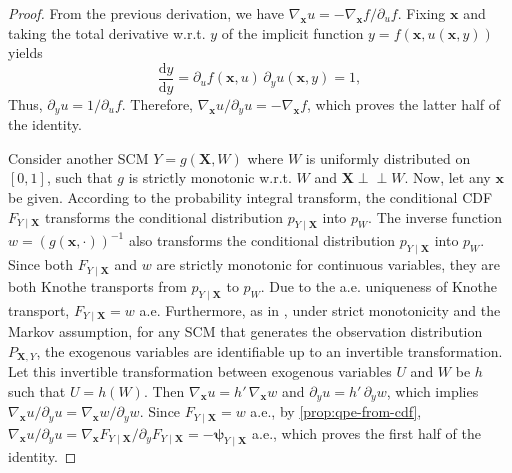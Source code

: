 \documentclass{article}
\theoremstyle{plain}
\theoremstyle{definition}
\theoremstyle{remark}
\newcommand{\indep}{\perp\!\!\!\perp}
\begin{document}
\qpecv*
\begin{proof}
From the previous derivation, we have $\nabla_{\bm{x}} u=-\nabla_{\bm{x}} f/\partial_u f$. Fixing $\bm{x}$ and taking the total derivative w.r.t. $y$ of the implicit function $y=f(\bm{x},u(\bm{x},y))$ yields
\[\frac{\text{d}y}{\text{d}y}=\partial_u f(\bm{x},u)\,\partial_y u(\bm{x},y)=1,\]
Thus, $\partial_yu=1/\partial_uf$. Therefore, $\nabla_{\bm{x}} u/\partial_yu=-\nabla_{\bm{x}}f$, which proves the latter half of the identity.

Consider another SCM $Y=g(\bm{X},W)$ where $W$ is uniformly distributed on $[0,1]$, such that $g$ is strictly monotonic w.r.t. $W$ and $\bm{X}\indep W$. Now, let any $\bm{x}$ be given. According to the probability integral transform, the conditional CDF $F_{Y\mid\bm{X}}$ transforms the conditional distribution $p_{Y\mid\bm{X}}$ into $p_W$. The inverse function $w=(g(\bm{x},\cdot))^{-1}$ also transforms the conditional distribution $p_{Y\mid\bm{X}}$ into $p_W$. Since both $F_{Y\mid\bm{X}}$ and $w$ are strictly monotonic for continuous variables, they are both Knothe transports from $p_{Y\mid\bm{X}}$ to $p_W$. Due to the a.e. uniqueness of Knothe transport, $F_{Y\mid\bm{X}}=w$ a.e. Furthermore, as in \citep{Nasr-Esfahany2023}, under strict monotonicity and the Markov assumption, for any SCM that generates the observation distribution $P_{\bm{X},Y}$, the exogenous variables are identifiable up to an invertible transformation. Let this invertible transformation between exogenous variables $U$ and $W$ be $h$ such that $U=h(W)$. Then $\nabla_{\bm{x}}u=h'\,\nabla_{\bm{x}}w$ and $\partial_yu=h'\,\partial_yw$, which implies $\nabla_{\bm{x}} u/\partial_yu=\nabla_{\bm{x}} w/\partial_yw$. Since $F_{Y\mid\bm{X}}=w$ a.e., by \cref{prop:qpe-from-cdf}, $\nabla_{\bm{x}}u/\partial_yu=\nabla_{\bm{x}}F_{Y\mid\bm{X}}/\partial_yF_{Y\mid\bm{X}}=-\bm{\psi}_{Y\mid\bm{X}}$ a.e., which proves the first half of the identity.
\end{proof}
\end{document}

